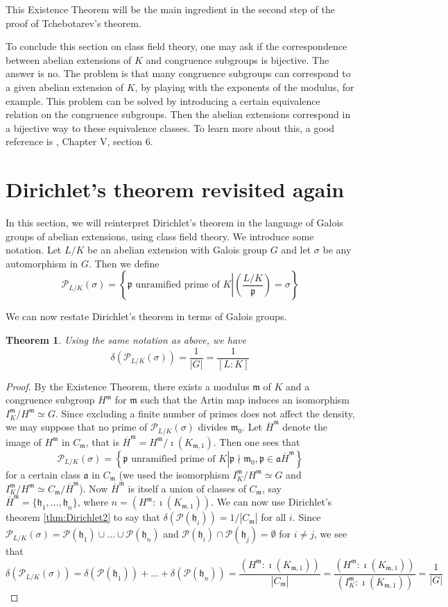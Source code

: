 \documentclass[]{amsart}
\newtheorem{theorem}{Theorem}
\newcommand{\m}{\mathfrak{m}}
\newcommand{\IKm}{I^\mathfrak{m}_K}
\newcommand{\Kmo}{K_{\mathfrak{m},1}}
\renewcommand{\a}{\mathfrak{a}}
\newcommand{\p}{\mathfrak{p}}
\newcommand{\PP}{\mathcal{P}}
\newcommand{\Frob}[2]{\left(\frac{#1}{#2}\right )}
\begin{document}
		This Existence Theorem will be the main ingredient in the second step of the proof of Tchebotarev's theorem.
		
		To conclude this section on class field theory, one may ask if the correspondence between abelian extensions of $K$ and congruence subgroups is bijective. The answer is no. The problem is that many congruence subgroups can correspond to a given abelian extension of $K$, by playing with the exponents of the modulus, for example. This problem can be solved by introducing a certain equivalence relation on the congruence subgroups. Then the abelian extensions correspond in a bijective way to these equivalence classes. To learn more about this, a good reference is \cite{Jan}, Chapter V, section 6.
		
		\section{Dirichlet's theorem revisited again}
			In this section, we will reinterpret Dirichlet's theorem in the language of Galois groups of abelian extensions, using class field theory. We introduce some notation. Let $L/K$ be an abelian extension with Galois group $G$ and let $\sigma$ be any automorphism in $G$. Then we define
			\[\PP_{L/K}(\sigma)=\left \{\p\text{ unramified prime of }K\left |\Frob{L/K}{\p}=\sigma\right .\right \}\]
		
		We can now restate Dirichlet's theorem in terms of Galois groups.
		\begin{theorem}
			Using the same notation as above, we have
			\[\delta(\PP_{L/K}(\sigma))=\frac{1}{|G|}=\frac{1}{[L:K]}\]
		\end{theorem}
		\begin{proof}
			By the Existence Theorem, there exists a modulus $\m$ of $K$ and a congruence subgroup $H^\m$ for $\m$ such that the Artin map induces an isomorphism $\IKm/H^\m\simeq G$. Since excluding a finite number of primes does not affect the density, we may suppose that no prime of $\PP_{L/K}(\sigma)$ divides $\m_0$. Let $\overline{H}^\m$ denote the image of $H^\m$ in $C_\m$, that is $\overline{H}^\m=H^\m/\imath(\Kmo)$. Then one sees that 
			\[\PP_{L/K}(\sigma)=\left \{\p\text{ unramified prime of }K\left |\p\nmid\m_0, \p\in \a \overline{H}^\m\right .\right \}\]
		for a certain class $\a$ in $C_\m$ (we used the isomorphism $\IKm/H^\m\simeq G$ and $\IKm/H^\m\simeq C_\m/\overline{H}^\m$). Now $\overline{H}^\m$ is itself a union of classes of $C_\m$, say $\overline{H}^\m=\{\mathfrak{h}_1,\dots,\mathfrak{h}_n\}$, where $n=(H^\m:\imath(\Kmo))$. We can now use Dirichlet's theorem \ref{thm:Dirichlet2} to say that $\delta(\PP(\mathfrak{h}_i))=1/|C_\m|$ for all $i$. Since $\PP_{L/K}(\sigma)=\PP(\mathfrak{h}_1)\cup\dots\cup\PP(\mathfrak{h}_n)$ and $\PP(\mathfrak{h}_i)\cap\PP(\mathfrak{h}_j)=\emptyset$ for $i\neq j$, we see that
			\[\delta(\PP_{L/K}(\sigma))=\delta(\PP(\mathfrak{h}_1))+\dots+\delta(\PP(\mathfrak{h}_n))=\frac{(H^\m:\imath(\Kmo))}{|C_\m|}=\frac{(H^\m:\imath(\Kmo))}{(\IKm:\imath(\Kmo))}=\frac{1}{|G|}\]
		\end{proof}
		
\end{document}
